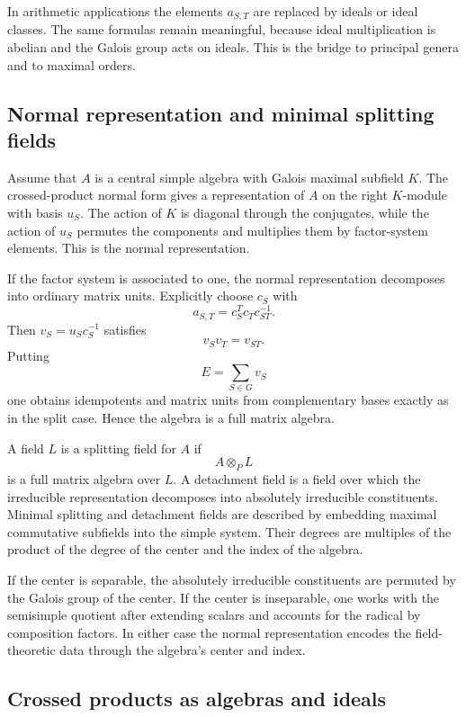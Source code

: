 \documentclass[11pt]{article}
\begin{document}
In arithmetic applications the elements \(a_{S,T}\) are replaced by ideals or ideal classes. The same formulas remain meaningful, because ideal multiplication is abelian and the Galois group acts on ideals. This is the bridge to principal genera and to maximal orders.

\subsection{Normal representation and minimal splitting fields}

Assume that \(A\) is a central simple algebra with Galois maximal subfield \(K\). The crossed-product normal form gives a representation of \(A\) on the right \(K\)-module with basis \(u_S\). The action of \(K\) is diagonal through the conjugates, while the action of \(u_S\) permutes the components and multiplies them by factor-system elements. This is the normal representation.

If the factor system is associated to one, the normal representation decomposes into ordinary matrix units. Explicitly choose \(c_S\) with
\[
  a_{S,T}=c_S^Tc_Tc_{ST}^{-1}.
\]
Then \(v_S=u_Sc_S^{-1}\) satisfies
\[
  v_Sv_T=v_{ST}.
\]
Putting
\[
  E=\sum_{S\in G}v_S
\]
one obtains idempotents and matrix units from complementary bases exactly as in the split case. Hence the algebra is a full matrix algebra.

A field \(L\) is a splitting field for \(A\) if
\[
  A\otimes_PL
\]
is a full matrix algebra over \(L\). A detachment field is a field over which the irreducible representation decomposes into absolutely irreducible constituents. Minimal splitting and detachment fields are described by embedding maximal commutative subfields into the simple system. Their degrees are multiples of the product of the degree of the center and the index of the algebra.

If the center is separable, the absolutely irreducible constituents are permuted by the Galois group of the center. If the center is inseparable, one works with the semisimple quotient after extending scalars and accounts for the radical by composition factors. In either case the normal representation encodes the field-theoretic data through the algebra's center and index.

\subsection{Crossed products as algebras and ideals}
\end{document}

